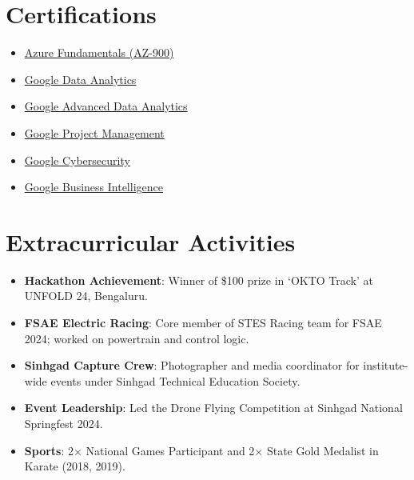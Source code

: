 \documentclass[letterpaper,11pt]{article}
\newcommand{\resumeItem}[2]{\item\small{\textbf{#1}{: #2 \vspace{-2pt}}}}
\newcommand{\resumeSubHeadingListStart}{\begin{itemize}[leftmargin=*]}
\newcommand{\resumeSubHeadingListEnd}{\end{itemize}}
\begin{document}
\section{Certifications}
\vspace{-10pt}
\begin{multicols}{3}
\begin{itemize}[leftmargin=*, itemsep=2pt, parsep=0pt]
  \item \href{https://litzeus.github.io/certificates/Azure_certification.pdf}{Azure Fundamentals (AZ-900)}
  \item \href{https://litzeus.github.io/certificates/google-data-analytics-cert.pdf}{Google Data Analytics}
  \item \href{https://litzeus.github.io/certificates/google-advanced-data-analytics-cert.pdf}{Google Advanced Data Analytics}
  \item \href{https://litzeus.github.io/certificates/google-project-management-cert.pdf}{Google Project Management}
  \item \href{https://litzeus.github.io/certificates/Google%20Cybersecurity%20Professional%20Certificate.pdf}{Google Cybersecurity}
  \item \href{https://litzeus.github.io/certificates/google-business-intelligence-cert.pdf}{Google Business Intelligence}
\end{itemize}
\end{multicols}

\section{Extracurricular Activities}
\resumeSubHeadingListStart
  \resumeItem{Hackathon Achievement}{Winner of \$100 prize in ‘OKTO Track’ at UNFOLD 24, Bengaluru.}
  \resumeItem{FSAE Electric Racing}{Core member of STES Racing team for FSAE 2024; worked on powertrain and control logic.}
  \resumeItem{Sinhgad Capture Crew}{Photographer and media coordinator for institute-wide events under Sinhgad Technical Education Society.}
  \resumeItem{Event Leadership}{Led the Drone Flying Competition at Sinhgad National Springfest 2024.}
  \resumeItem{Sports}{2× National Games Participant and 2× State Gold Medalist in Karate (2018, 2019).}
\resumeSubHeadingListEnd
\end{document}
